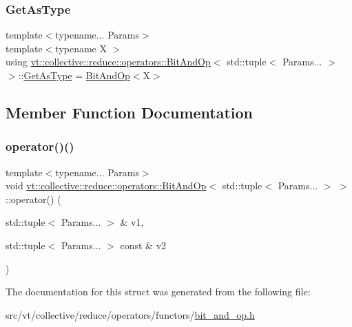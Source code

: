 \subsubsection{\texorpdfstring{Get\+As\+Type}{GetAsType}}
{\footnotesize\ttfamily template$<$typename... Params$>$ \\
template$<$typename X $>$ \\
using \hyperlink{structvt_1_1collective_1_1reduce_1_1operators_1_1_bit_and_op}{vt\+::collective\+::reduce\+::operators\+::\+Bit\+And\+Op}$<$ std\+::tuple$<$ Params... $>$ $>$\+::\hyperlink{structvt_1_1collective_1_1reduce_1_1operators_1_1_bit_and_op_3_01std_1_1tuple_3_01_params_8_8_8_01_4_01_4_afe2bd7f43c3c31f12596650daadd6cc9}{Get\+As\+Type} =  \hyperlink{structvt_1_1collective_1_1reduce_1_1operators_1_1_bit_and_op}{Bit\+And\+Op}$<$X$>$}



\subsection{Member Function Documentation}
\mbox{\label{structvt_1_1collective_1_1reduce_1_1operators_1_1_bit_and_op_3_01std_1_1tuple_3_01_params_8_8_8_01_4_01_4_a0ba9be3f1a6dff2256f2fa9ba94ba1cb}} 
\subsubsection{\texorpdfstring{operator()()}{operator()()}}
{\footnotesize\ttfamily template$<$typename... Params$>$ \\
void \hyperlink{structvt_1_1collective_1_1reduce_1_1operators_1_1_bit_and_op}{vt\+::collective\+::reduce\+::operators\+::\+Bit\+And\+Op}$<$ std\+::tuple$<$ Params... $>$ $>$\+::operator() (\begin{DoxyParamCaption}\item[{std\+::tuple$<$ Params... $>$ \&}]{v1,  }\item[{std\+::tuple$<$ Params... $>$ const \&}]{v2 }\end{DoxyParamCaption})\hspace{0.3cm}{\ttfamily [inline]}}



The documentation for this struct was generated from the following file\+:\begin{DoxyCompactItemize}
\item 
src/vt/collective/reduce/operators/functors/\hyperlink{bit__and__op_8h}{bit\+\_\+and\+\_\+op.\+h}\end{DoxyCompactItemize}
